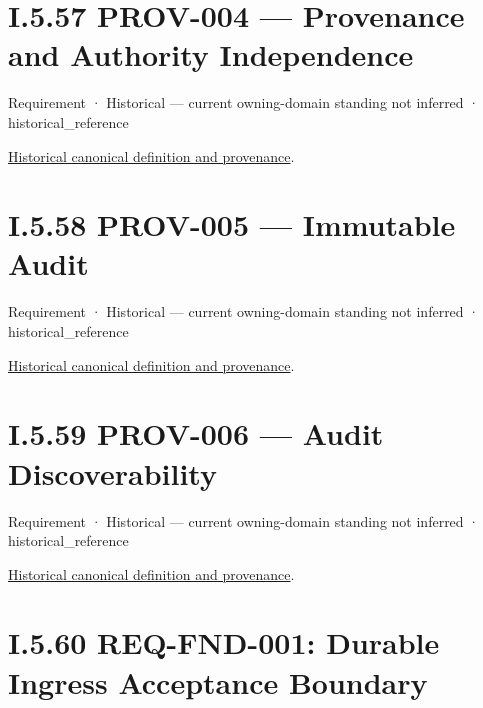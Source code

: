\section*{I.5.57 PROV-004 — Provenance and Authority Independence}
\label{navigation:I.5.57}

\label{element:3fb9a89d345a4cb6a56d62823316664e}
{\small Requirement · Historical — current owning-domain standing not inferred · historical\_reference}\par
\href{../../../../continuum/motivation/requirement/3fb9a89d345a4cb6a56d62823316664e.md}{Historical canonical definition and provenance}.\par
\section*{I.5.58 PROV-005 — Immutable Audit}
\label{navigation:I.5.58}

\label{element:0f7b23cfd94e450c8a2772879bc9bb1e}
{\small Requirement · Historical — current owning-domain standing not inferred · historical\_reference}\par
\href{../../../../continuum/motivation/requirement/0f7b23cfd94e450c8a2772879bc9bb1e.md}{Historical canonical definition and provenance}.\par
\section*{I.5.59 PROV-006 — Audit Discoverability}
\label{navigation:I.5.59}

\label{element:927c65d2d665451396782b4c1d7c8c86}
{\small Requirement · Historical — current owning-domain standing not inferred · historical\_reference}\par
\href{../../../../continuum/motivation/requirement/927c65d2d665451396782b4c1d7c8c86.md}{Historical canonical definition and provenance}.\par
\section*{I.5.60 REQ-FND-001: Durable Ingress Acceptance Boundary}
\label{navigation:I.5.60}

